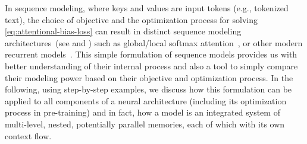 \documentclass{article}
\newcommand{\citep}{\parencite}
\begin{document}
In sequence modeling, where keys and values are input tokens (e.g., tokenized text), the choice of objective and the optimization process for solving \autoref{eq:attentional-bias-loss} can result in distinct sequence modeling architectures~(see \cite{liu2024longhorn} and \cite{behrouz2025Miras}) such as global/local softmax attention~\citep{transformers}, or other modern recurrent models~\citep{katharopoulos2020transformers, sun2023retentive, behrouz2024titans}. This simple formulation of sequence models provides us with better understanding of their internal process and also a tool to simply compare their modeling power based on their objective and optimization process. In the following, using step-by-step examples, we discuss how this formulation can be applied to all components of a neural architecture (including its optimization process in pre-training) and in fact, how a model is an integrated system of multi-level, nested, potentially parallel memories, each of which with its own context flow. 
\end{document}
